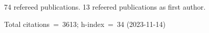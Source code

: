 74 refereed publications. 13 refeered publications as first author.

Total citations~=~3613; h-index~=~34 (2023-11-14)